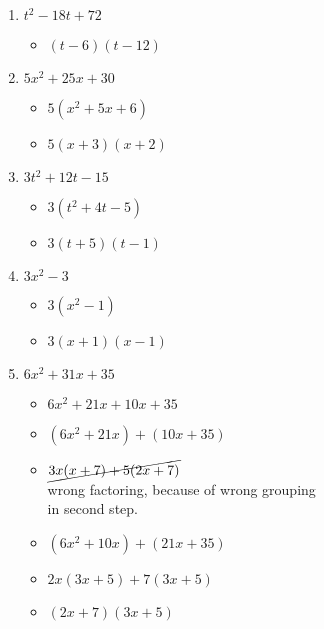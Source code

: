 \documentclass{article}
\begin{document}
\begin{onehalfspace}
\begin{enumerate}
        \item $t^{2} - 18t + 72$
        \begin{itemize}
            \item $(t - 6)(t - 12)$
        \end{itemize}

        \item $5x^{2} + 25x + 30$
        \begin{itemize}
            \item $5(x^{2} + 5x + 6)$
            \item $5(x + 3)(x + 2)$
        \end{itemize}

        \item $3t^{2} + 12t - 15$
        \begin{itemize}
            \item $3(t^{2} + 4t - 5)$
            \item $3(t + 5)(t - 1)$
        \end{itemize}

        \item $3x^{2} - 3$
        \begin{itemize}
            \item $3(x^{2} - 1)$
            \item $3(x + 1)(x - 1)$
        \end{itemize}

        \item $6x^{2} + 31x + 35$
        \begin{itemize}
            \item $6x^{2} + 21x + 10x + 35$
            \item $(6x^{2} + 21x) + (10x + 35)$
            \item $\cancel{3x(x + 7) + 5(2x + 7)}$ \\ 
            wrong factoring, because of wrong grouping \\
            in second step.
            \item $(6x^{2} + 10x) + (21x + 35)$
            \item $2x(3x + 5) + 7(3x + 5)$
            \item $(2x + 7)(3x + 5)$
        \end{itemize}
    \end{enumerate}
\end{onehalfspace}
\end{document}
